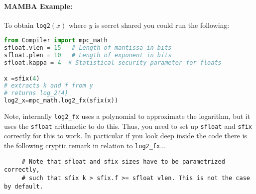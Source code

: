 \paragraph{MAMBA Example:} To obtain \verb|log2|$(x)$ where $y$ is secret shared you could run the following:
\begin{lstlisting}[language={python}]
from Compiler import mpc_math
sfloat.vlen = 15   # Length of mantissa in bits
sfloat.plen = 10   # Length of exponent in bits
sfloat.kappa = 4  # Statistical security parameter for floats

x =sfix(4)
# extracts k and f from y
# returns log_2(4)
log2_x=mpc_math.log2_fx(sfix(x))
\end{lstlisting}
Note, internally \verb+log2_fx+ uses a polynomial to approximate the logarithm, but it uses the \verb+sfloat+ arithmetic to do this.
Thus, you need to set up \verb+sfloat+ and \verb+sfix+ correctly for this to work.
In particular if you look deep inside the code there is the following cryptic remark in relation to \verb+log2_fx+...
\begin{verbatim}
     # Note that sfloat and sfix sizes have to be parametrized correctly,
     # such that sfix k > sfix.f >= sfloat vlen. This is not the case by default.
\end{verbatim}


